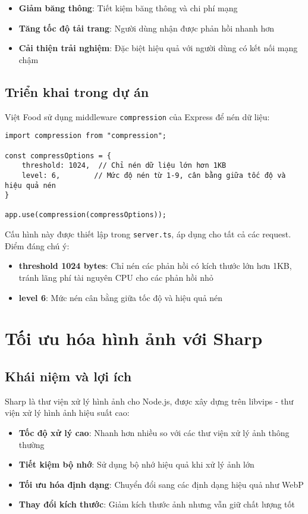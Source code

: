 \begin{itemize}
    \item \textbf{Giảm băng thông}: Tiết kiệm băng thông và chi phí mạng
    \item \textbf{Tăng tốc độ tải trang}: Người dùng nhận được phản hồi nhanh hơn
    \item \textbf{Cải thiện trải nghiệm}: Đặc biệt hiệu quả với người dùng có kết nối mạng chậm
\end{itemize}

\subsection{Triển khai trong dự án}
Việt Food sử dụng middleware \texttt{compression} của Express để nén dữ liệu:

\begin{verbatim}
import compression from "compression";

const compressOptions = {
    threshold: 1024,  // Chỉ nén dữ liệu lớn hơn 1KB
    level: 6,        // Mức độ nén từ 1-9, cân bằng giữa tốc độ và hiệu quả nén
}

app.use(compression(compressOptions));
\end{verbatim}

Cấu hình này được thiết lập trong \texttt{server.ts}, áp dụng cho tất cả các request. Điểm đáng chú ý:

\begin{itemize}
    \item \textbf{threshold 1024 bytes}: Chỉ nén các phản hồi có kích thước lớn hơn 1KB, tránh lãng phí tài nguyên CPU cho các phản hồi nhỏ
    \item \textbf{level 6}: Mức nén cân bằng giữa tốc độ và hiệu quả nén
\end{itemize}

\section{Tối ưu hóa hình ảnh với Sharp}

\subsection{Khái niệm và lợi ích}
Sharp là thư viện xử lý hình ảnh cho Node.js, được xây dựng trên libvips - thư viện xử lý hình ảnh hiệu suất cao:

\begin{itemize}
    \item \textbf{Tốc độ xử lý cao}: Nhanh hơn nhiều so với các thư viện xử lý ảnh thông thường
    \item \textbf{Tiết kiệm bộ nhớ}: Sử dụng bộ nhớ hiệu quả khi xử lý ảnh lớn
    \item \textbf{Tối ưu hóa định dạng}: Chuyển đổi sang các định dạng hiệu quả như WebP
    \item \textbf{Thay đổi kích thước}: Giảm kích thước ảnh nhưng vẫn giữ chất lượng tốt
\end{itemize}

